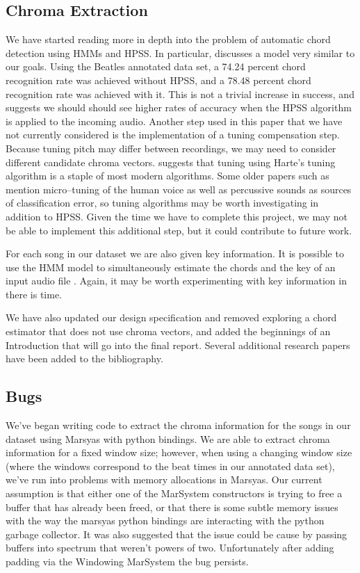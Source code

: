 \documentclass{article}
\begin{document}
\subsection{Chroma Extraction}
We have started reading more in depth into the problem of automatic chord
detection using HMMs and HPSS. In particular, \cite{Ueda:19} discusses a model
very similar to our goals.  Using the Beatles annotated data set, a 74.24
percent chord recognition rate was achieved without HPSS, and a 78.48 percent
chord recognition rate was achieved with it. This is not a trivial increase in
success, and suggests we should should see higher rates of accuracy when the
HPSS algorithm is applied to the incoming audio. Another step used in this
paper that we have not currently considered is the implementation of a tuning
compensation step. Because tuning pitch may differ between recordings, we may
need to consider different candidate chroma vectors.  \cite{McVicar:00}
suggests that tuning using Harte's tuning algorithm is a staple of most modern
algorithms.  Some older papers such as \cite{Zenz:20} mention micro--tuning of
the human voice as well as percussive sounds as sources of classification
error, so tuning algorithms may be worth investigating in addition to HPSS. Given the time we have to complete this project, we may not be able to implement this additional step, but it could contribute to future work.

For each song in our dataset we are also given key information. It is possible to use the HMM model to simultaneously estimate the chords and the key of an input audio file \cite{McVicar:00}. Again, it may be worth experimenting with key information in there is time.

We have also updated our design specification and removed exploring a chord estimator that does not use chroma vectors, and added the beginnings of an Introduction that will go into the final report. Several additional research papers have been added to the bibliography.

\subsection{Bugs}
We've began writing code to extract the chroma information for the songs in our
dataset using Marsyas with python bindings. We are able to extract chroma information for
a fixed window size; however, when using a changing window size (where the
windows correspond to the beat times in our annotated data set), we've run into
problems with memory allocations in Marsyas. Our current assumption is that
either one of the MarSystem constructors is trying to free a buffer that has
already been freed, or that there is some subtle memory issues with the way the
marsyas python bindings are interacting with the python garbage collector. It was also suggested that the issue could be cause by passing buffers into spectrum that weren't powers of two. Unfortunately after adding padding via the Windowing MarSystem the bug persists. 
\end{document}
